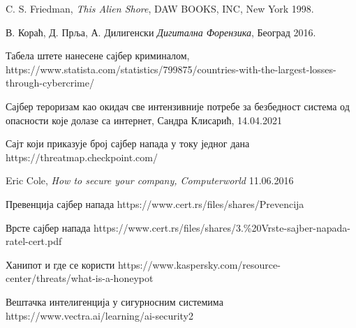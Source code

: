 \documentclass[a4paper]{article}
\begin{document}
\newpage
    \appendix

     
    

    \begin{thebibliography}{9}

    C. S. Friedman, \emph{This Alien Shore}, DAW BOOKS, INC, New York 1998.

    В. Кораћ, Д. Прља, А. Дилигенски \emph{Дигитална Форензика}, Београд 2016.

    Табела штете нанесене сајбер криминалом, https://www.statista.com/statistics/799875/countries-with-the-largest-losses-through-cybercrime/
    
    Сајбер тероризам као окидач све интензивније потребе за безбедност система од опасности које долазе са интернет, Сандра Клисарић, 14.04.2021
	  
     Сајт који приказује број сајбер напада у току једног дана https://threatmap.checkpoint.com/
	  
    Eric Cole, \emph{How to secure your company, Computerworld} 11.06.2016 
	  
    Превенција сајбер напада https://www.cert.rs/files/shares/Prevencija%
	  
    Врсте сајбер напада https://www.cert.rs/files/shares/3.\%20Vrste-sajber-napada-ratel-cert.pdf
	  
    Ханипот и где се користи https://www.kaspersky.com/resource-center/threats/what-is-a-honeypot
	  
     Вештачка интелигенција у сигурносним системима https://www.vectra.ai/learning/ai-security2
    
    \end{thebibliography}
	
    \appendix
\end{document}
